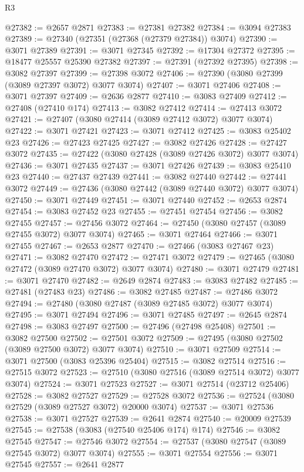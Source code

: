 \begin{lexlean}{R3}
\begin{coremodule}
@27382 := @2657 @2871
@27383 := @27381 @27382
@27384 := @3094 @27383
@27389 := @27340 (@27351 (@27368 (@27379 @27384)) @3074)
@27390 := @3071 @27389
@27391 := @3071 @27345
@27392 := @17304 @27372
@27395 := @18477 @25557 @25390 @27382
@27397 := @27391 (@27392 @27395)
@27398 := @3082 @27397
@27399 := @27398 @3072
@27406 := @27390 (@3080 @27399 (@3089 @27397 @3072) @3077 @3074)
@27407 := @3071 @27406
@27408 := @3071 @27397
@27409 := @2636 @2877
@27410 := @3083 @27409
@27412 := @27408 (@27410 @174)
@27413 := @3082 @27412
@27414 := @27413 @3072
@27421 := @27407 (@3080 @27414 (@3089 @27412 @3072) @3077 @3074)
@27422 := @3071 @27421
@27423 := @3071 @27412
@27425 := @3083 @25402 @23
@27426 := @27423 @27425
@27427 := @3082 @27426
@27428 := @27427 @3072
@27435 := @27422 (@3080 @27428 (@3089 @27426 @3072) @3077 @3074)
@27436 := @3071 @27435
@27437 := @3071 @27426
@27439 := @3083 @25410 @23
@27440 := @27437 @27439
@27441 := @3082 @27440
@27442 := @27441 @3072
@27449 := @27436 (@3080 @27442 (@3089 @27440 @3072) @3077 @3074)
@27450 := @3071 @27449
@27451 := @3071 @27440
@27452 := @2653 @2874
@27454 := @3083 @27452 @23
@27455 := @27451 @27454
@27456 := @3082 @27455
@27457 := @27456 @3072
@27464 := @27450 (@3080 @27457 (@3089 @27455 @3072) @3077 @3074)
@27465 := @3071 @27464
@27466 := @3071 @27455
@27467 := @2653 @2877
@27470 := @27466 (@3083 @27467 @23)
@27471 := @3082 @27470
@27472 := @27471 @3072
@27479 := @27465 (@3080 @27472 (@3089 @27470 @3072) @3077 @3074)
@27480 := @3071 @27479
@27481 := @3071 @27470
@27482 := @2649 @2874
@27483 := @3083 @27482
@27485 := @27481 (@27483 @23)
@27486 := @3082 @27485
@27487 := @27486 @3072
@27494 := @27480 (@3080 @27487 (@3089 @27485 @3072) @3077 @3074)
@27495 := @3071 @27494
@27496 := @3071 @27485
@27497 := @2645 @2874
@27498 := @3083 @27497
@27500 := @27496 (@27498 @25408)
@27501 := @3082 @27500
@27502 := @27501 @3072
@27509 := @27495 (@3080 @27502 (@3089 @27500 @3072) @3077 @3074)
@27510 := @3071 @27509
@27514 := @3071 @27500 (@3083 @25396 @25404)
@27515 := @3082 @27514
@27516 := @27515 @3072
@27523 := @27510 (@3080 @27516 (@3089 @27514 @3072) @3077 @3074)
@27524 := @3071 @27523
@27527 := @3071 @27514 (@23712 @25406)
@27528 := @3082 @27527
@27529 := @27528 @3072
@27536 := @27524 (@3080 @27529 (@3089 @27527 @3072) @20000 @3074)
@27537 := @3071 @27536
@27538 := @3071 @27527
@27539 := @2641 @2874
@27540 := @20009 @27539
@27545 := @27538 (@3083 (@27540 @25406 @174) @174)
@27546 := @3082 @27545
@27547 := @27546 @3072
@27554 := @27537 (@3080 @27547 (@3089 @27545 @3072) @3077 @3074)
@27555 := @3071 @27554
@27556 := @3071 @27545
@27557 := @2641 @2877

\end{coremodule}
\end{lexlean}
